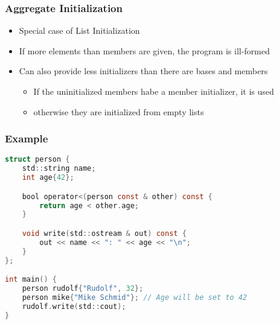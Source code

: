 \subsubsection{Aggregate Initialization}
\begin{itemize}
    \item Special case of List Initialization
    \item If more elements than members are given, the program is ill-formed
    \item Can also provide less initializers than there are bases and members
    \begin{itemize}
        \item If the uninitialized members habe a member initializer, it is used
        \item otherwise they are initialized from empty lists
    \end{itemize}
\end{itemize}

\subsubsection{Example}

\begin{lstlisting}[style=frame, style= linenumbers, language=C]
struct person {
    std::string name;
    int age{42};

    bool operator<(person const & other) const {
        return age < other.age;
    }

    void write(std::ostream & out) const {
        out << name << ": " << age << "\n";
    }
};

int main() {
    person rudolf{"Rudolf", 32};
    person mike{"Mike Schmid"}; // Age will be set to 42
    rudolf.write(std::cout);
}
\end{lstlisting}


















